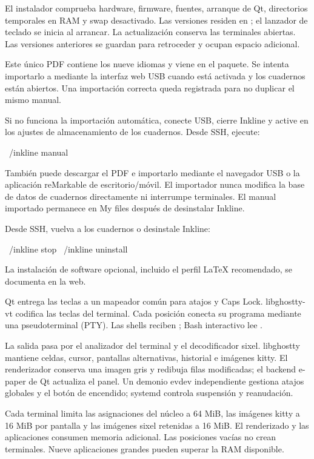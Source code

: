 \InstallLink

El instalador comprueba hardware, firmware, fuentes, arranque de Qt, directorios
temporales en RAM y swap desactivado. Las versiones residen en
; el lanzador de teclado se inicia al arrancar.
La actualización conserva las terminales abiertas.  Las versiones anteriores se guardan para
retroceder y ocupan espacio adicional.

Este único PDF contiene los nueve idiomas y viene en el paquete. Se intenta
importarlo a  mediante la interfaz web USB cuando está activada
y los cuadernos están abiertos. Una importación correcta queda registrada
para no duplicar el mismo manual.

Si no funciona la importación automática, conecte USB, cierre Inkline y active
 en los ajustes de almacenamiento de los cuadernos.
Desde SSH, ejecute:
\begin{shell}
~/inkline manual
\end{shell}
También puede descargar el PDF e importarlo mediante el navegador USB o la
aplicación reMarkable de escritorio/móvil. El importador nunca modifica la
base de datos de cuadernos directamente ni interrumpe terminales. El manual
importado permanece en My files después de desinstalar Inkline.

Desde SSH, vuelva a los cuadernos o desinstale Inkline:
\begin{shell}
~/inkline stop
~/inkline uninstall
\end{shell}
La instalación de software opcional, incluido el perfil LaTeX recomendado,
se documenta en la web.

Qt entrega las teclas a un mapeador común para atajos y Caps Lock.
libghostty-vt codifica las teclas del terminal. Cada posición conecta su
programa mediante una pseudoterminal (PTY). Las shells reciben
; Bash interactivo lee .

La salida pasa por el analizador del terminal y el decodificador sixel.
libghostty mantiene celdas, cursor, pantallas alternativas, historial e imágenes
kitty. El renderizador conserva una imagen gris y redibuja filas modificadas;
el backend e-paper de Qt actualiza el panel. Un demonio evdev independiente
gestiona atajos globales y el botón de encendido; systemd controla suspensión y reanudación.

Cada terminal limita las asignaciones del núcleo a 64 MiB, las imágenes kitty
a 16 MiB por pantalla y las imágenes sixel retenidas a 16 MiB. El renderizado
y las aplicaciones consumen memoria adicional. Las posiciones vacías no crean
terminales. Nueve aplicaciones grandes pueden superar la RAM disponible.

